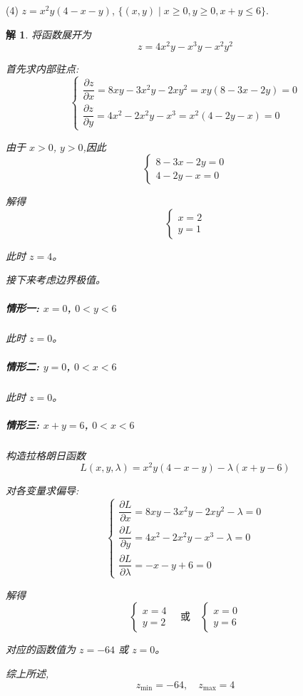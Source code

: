 \documentclass[a4paper,12pt]{article}
\newtheorem*{sol}{解}
\begin{document}
(4) $z = x^2y(4 - x - y)$, $\{(x,y)\mid x \geq 0,y \geq 0,x + y \leq 6\}$.
\begin{sol}
    将函数展开为
    $$z=4x^2y-x^3y-x^2y^2$$

    首先求内部驻点:
    $$\begin{cases}
            \dfrac{\partial z}{\partial x}=8xy-3x^2y-2xy^2=xy(8-3x-2y)=0 \\[8pt]
            \dfrac{\partial z}{\partial y}=4x^2-2x^2y-x^3=x^2(4-2y-x)=0
        \end{cases}$$

    由于 $x>0$, $y>0$,因此
    $$\begin{cases}
            8-3x-2y=0 \\
            4-2y-x=0
        \end{cases}$$

    解得
    $$\begin{cases}
            x=2 \\
            y=1
        \end{cases}$$

    此时 $z=4$。

    接下来考虑边界极值。

    \subparagraph*{情形一: $x=0$, $0<y<6$}

    此时 $z=0$。

    \subparagraph*{情形二: $y=0$, $0<x<6$}

    此时 $z=0$。

    \subparagraph*{情形三: $x+y=6$, $0<x<6$}

    构造拉格朗日函数
    $$L(x,y,\lambda)=x^2y(4-x-y)-\lambda(x+y-6)$$

    对各变量求偏导:
    $$\begin{cases}
            \dfrac{\partial L}{\partial x}=8xy-3x^2y-2xy^2-\lambda=0 \\[8pt]
            \dfrac{\partial L}{\partial y}=4x^2-2x^2y-x^3-\lambda=0  \\[8pt]
            \dfrac{\partial L}{\partial \lambda}=-x-y+6=0
        \end{cases}$$

    解得
    $$\begin{cases}
            x=4 \\
            y=2
        \end{cases}\quad\text{或}\quad\begin{cases}
            x=0 \\
            y=6
        \end{cases}$$

    对应的函数值为 $z=-64$ 或 $z=0$。

    综上所述,
    $$z_{\min}=-64,\quad z_{\max}=4$$
\end{sol}
\end{document}
